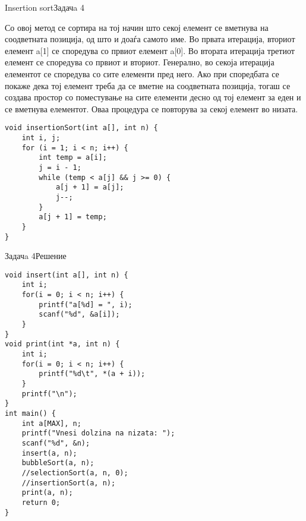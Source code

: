 \begin{frame}[fragile]{Insertion sort}{Задачa 4}
\begin{scriptsize}
Со овој метод се сортира на тој начин што секој елемент се вметнува на
соодветната позиција, од што и доаѓа самото име. Во првата итерација, вториот
елемент a[1] се споредува со првиот елемент a[0]. Во втората итерација третиот
елемент се споредува со првиот и вториот. Генерално, во секоја итерација
елементот се споредува со сите елементи пред него. Ако при споредбата се покаже
дека тој елемент треба да се вметне на соодветната позиција, тогаш се создава
простор со поместување на сите елементи десно од тој елемент за еден и се
вметнува елементот. Оваа процедура се повторува за секој елемент во низата. 
\end{scriptsize}
\begin{lstlisting}
void insertionSort(int a[], int n) {
    int i, j;
    for (i = 1; i < n; i++) {
        int temp = a[i];
        j = i - 1;
        while (temp < a[j] && j >= 0) {
            a[j + 1] = a[j];
            j--;
        }
        a[j + 1] = temp;
    }
}
\end{lstlisting}
\end{frame}

\begin{frame}[fragile]{Задачa 4}{Решение}
\begin{lstlisting}
void insert(int a[], int n) {
    int i;
    for(i = 0; i < n; i++) {
        printf("a[%d] = ", i);
        scanf("%d", &a[i]);
    }
}
void print(int *a, int n) {
    int i;
    for(i = 0; i < n; i++) {
        printf("%d\t", *(a + i));
    }
    printf("\n");
}
int main() {
    int a[MAX], n;
    printf("Vnesi dolzina na nizata: ");
    scanf("%d", &n);
    insert(a, n);
    bubbleSort(a, n);
    //selectionSort(a, n, 0);
    //insertionSort(a, n);
    print(a, n);
    return 0;
}
\end{lstlisting}
\end{frame}

